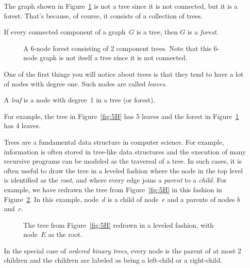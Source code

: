 The graph shown in Figure~\ref{fig:5I} is not a tree since it is not
connected, but it is a forest.  That's because, of course, it consists
of a collection of trees.

\begin{definition}\label{def:forest}
If every connected component of a graph~$G$ is a tree, then $G$ is a
\emph{forest}.
\end{definition}

\begin{figure}


\caption{A 6-node forest consisting of 2 component trees.  Note that
  this 6-node graph is not itself a tree since it is not connected.}
\label{fig:5I}
\end{figure}

One of the first things you will notice about trees is that they tend
to have a lot of nodes with degree one.  Such nodes are called
\emph{leaves}.

\begin{definition}
A \emph{leaf} is a node with degree~1 in a tree (or forest).
\end{definition}

For example, the tree in Figure~\ref{fig:5H} has 5 leaves and the
forest in Figure~\ref{fig:5I} has 4 leaves.

Trees are a fundamental data structure in computer science.  For
example, information is often stored in tree-like data structures and
the execution of many recursive programs can be modeled as the
traversal of a tree.  In such cases, it is often useful to draw the
tree in a leveled fashion where the node in the top level is
identified as the \emph{root}, and where every edge joins a
\emph{parent} to a \emph{child}.  For example, we have redrawn the
tree from Figure~\ref{fig:5H} in this fashion in Figure~\ref{fig:5JJ}.
In this example, node~$d$ is a child of node~$e$ and a parents of
nodes $b$ and~$c$.

\begin{figure}


\caption{The tree from Figure~\ref{fig:5H} redrawn in a leveled
  fashion, with node~$E$ as the root.}

\label{fig:5JJ}
\end{figure}

In the special case of \emph{ordered binary trees}, every node is the
parent of at most 2 children and the children are labeled as being a
left-child or a right-child.


